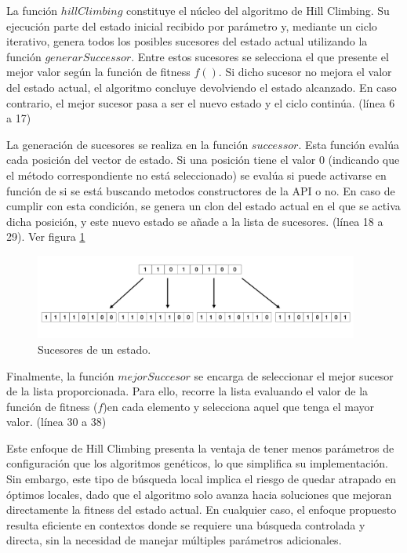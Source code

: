 La función $hillClimbing$ constituye el núcleo del algoritmo de Hill Climbing. Su ejecución parte del estado inicial recibido por parámetro y, 
mediante un ciclo iterativo, genera todos los posibles sucesores del estado actual utilizando la función $generarSuccessor$. 
Entre estos sucesores se selecciona el que presente el mejor valor según la función de fitness $f()$. Si dicho sucesor no mejora el valor del estado actual,
el algoritmo concluye devolviendo el estado alcanzado. En caso contrario, el mejor sucesor pasa a ser el nuevo estado y el ciclo continúa. (línea 6 a 17)

La generación de sucesores se realiza en la función $successor$. Esta función evalúa cada posición del vector de estado. Si una posición tiene el valor 0 
(indicando que el método correspondiente no está seleccionado) se evalúa si puede activarse en función de si se está buscando metodos constructores de la API o no. 
En caso de cumplir con esta condición, se genera un clon del estado actual en el que se activa dicha posición, y este nuevo estado se añade a la lista de sucesores. (línea 18 a 29). Ver figura \ref{fig:succ-hillClimbing}

\begin{figure}[H]
    \centering
    \includegraphics[width=0.95\textwidth]{images/succesores.png}
    \caption{Sucesores de un estado.}
    \label{fig:succ-hillClimbing}
  \end{figure}
  
Finalmente, la función $mejorSuccesor$ se encarga de seleccionar el mejor sucesor de la lista proporcionada.
Para ello, recorre la lista evaluando el valor de la función de fitness ($f$)en cada elemento y selecciona aquel que tenga el mayor valor. (línea 30 a 38)

Este enfoque de Hill Climbing presenta la ventaja de tener menos parámetros de configuración que los algoritmos genéticos, 
lo que simplifica su implementación. Sin embargo, este tipo de búsqueda local implica el riesgo de quedar atrapado en óptimos locales, 
dado que el algoritmo solo avanza hacia soluciones que mejoran directamente la fitness del estado actual. 
En cualquier caso, el enfoque propuesto resulta eficiente en contextos donde se requiere una búsqueda controlada y directa, 
sin la necesidad de manejar múltiples parámetros adicionales.



